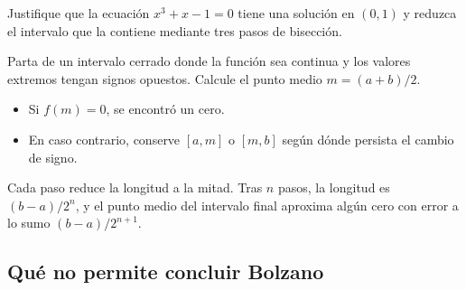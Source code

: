 \documentclass[10pt,a5paper]{article}
\newif\ifmostrarSoluciones
\begin{document}
\begin{ejemplo}
Justifique que la ecuación $x^3+x-1=0$ tiene una solución en $(0,1)$ y reduzca el intervalo que la contiene mediante tres pasos de bisección.
\end{ejemplo}
\ifmostrarSoluciones
\begin{solucion}
La función $f(x)=x^3+x-1$ es continua en $[0,1]$, con $f(0)=-1$ y $f(1)=1$. Por Bolzano, existe un cero en $(0,1)$.

En cada paso se evalúa el punto medio y se conserva la mitad cuyos extremos tienen signos opuestos:
\[
  \begin{array}{c|c|c|c}
    \text{Paso}&\text{Punto medio}&f(\text{punto medio})&\text{Intervalo conservado}\\ \hline
    1&1/2&-3/8&[1/2,1]\\
    2&3/4&11/64&[1/2,3/4]\\
    3&5/8&-67/512&[5/8,3/4]
  \end{array}
\]
Así, se localiza al menos un cero en $(0.625,0.75)$. Si se usa el punto medio $0.6875$ como aproximación, su distancia a un cero de ese intervalo es menor que $0.0625$, la mitad de la longitud del intervalo.
\end{solucion}
\else\vspace{30mm}\fi

\begin{criterio}[bisección]
Parta de un intervalo cerrado donde la función sea continua y los valores extremos tengan signos opuestos. Calcule el punto medio $m=(a+b)/2$.
\begin{itemize}
  \item Si $f(m)=0$, se encontró un cero.
  \item En caso contrario, conserve $[a,m]$ o $[m,b]$ según dónde persista el cambio de signo.
\end{itemize}
Cada paso reduce la longitud a la mitad. Tras $n$ pasos, la longitud es $(b-a)/2^n$, y el punto medio del intervalo final aproxima algún cero con error a lo sumo $(b-a)/2^{n+1}$.
\end{criterio}

\subsection*{Qué no permite concluir Bolzano}
\end{document}
